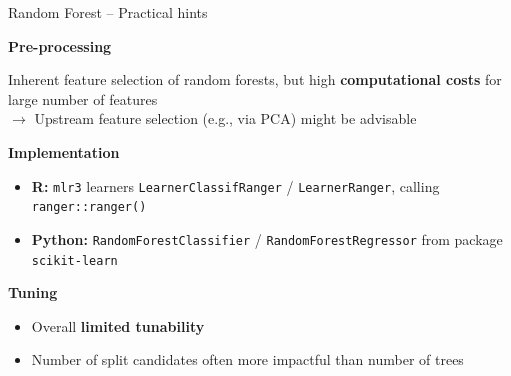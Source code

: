 \documentclass[11pt,compress,t,notes=noshow, xcolor=table]{beamer}
\newcommand{\highlight}[1]{\textcolor{highlightcol}{\textbf{#1}}}
\let\code=\texttt
\begin{document}
\begin{frame}{Random Forest -- Practical hints}

\footnotesize

\highlight{Pre-processing} 

Inherent feature selection of random forests, but high \textbf{computational 
costs} for large number of features \\
$\rightarrow$ Upstream feature selection (e.g., via PCA) might be advisable
\lz

\highlight{Implementation}

\begin{itemize}
  \item \textbf{R:} \code{mlr3} learners \code{LearnerClassifRanger} / 
    \code{LearnerRanger}, calling \code{ranger::ranger()}
  \item \textbf{Python:} \code{RandomForestClassifier} / 
  \code{RandomForestRegressor} from package \code{scikit-learn}
\end{itemize}

\medskip

\highlight{Tuning} 

\begin{itemize}
  \item Overall \textbf{limited tunability}
  \item Number of split candidates often more impactful than number of trees
\end{itemize}

\end{frame}

\end{document}
